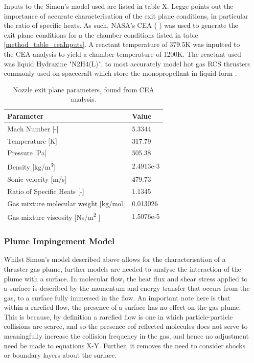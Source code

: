 \documentclass[journal]{new-aiaa}
\begin{document}
Inputs to the Simon's model used are listed in table X. Legge points out the importance of accurate characterisation of the exit plane conditions, in particular the ratio of specific heats. As such, NASA's CEA (\cite{josephbanksChemicalEquilibriumApplications2023} ) was used to generate the exit plane conditions for a the chamber conditions listed in table \ref{method_table_ceaInputs}. A reactant temperature of 379.5K was inputted to the CEA analysis to yield a chamber temperature of 1200K. The reactant used was liquid Hydrazine "N2H4(L)", to most accurately model hot gas RCS thrusters commonly used on spacecraft which store the monopropellant in liquid form \cite{greatrixLiquidPropellantRocketEngines2012,suttonRocketPropulsionElements2011}.





\begin{table}
    \centering
    \caption{Nozzle exit plane parameters, found from CEA analysis.}
    \begin{tabular}{ll}
    \hline
    \hline
    Parameter & Value \\
    \hline
    Mach Number [-] & 5.3344 \\
    Temperature [K] & 317.79 \\
    Pressure [Pa] & 505.38 \\
    Density [kg/m\textsuperscript{3}] & 2.4913e-3 \\
    Sonic velocity [m/s] & 479.73 \\
    Ratio of Specific Heats [-] & 1.1345 \\
    Gas mixture molecular weight [kg/mol] & 0.013026 \\
    Gas mixture viscosity [Ns/m\textsuperscript{2} ] & 1.5076e-5 \\


    \hline
    \hline
    \end{tabular}
    \label{method_table_simonsInputs}
\end{table}





    
\subsubsection{Plume Impingement Model}

Whilst Simon's model described above allows for the characterisation of a thruster gas plume, further models are needed to analyse the interaction of the plume with a surface. In molecular flow, the heat flux and shear stress applied to a surface is described by the momentum and energy transfer that occurs from the gas, to a surface fully immersed in the flow. An important note here is that within a rarefied flow, the presence of a surface has no effect on the gas plume. This is because, by definition a rarefied flow is one in which particle-particle collisions are scarce, and so the presence eof reflected molecules does not serve to meaningfully increase the collision frequency in the gas, and hence no adjustment need be made to equations X-Y. Further, it removes the need to consider shocks or boundary layers about the surface.
\end{document}
